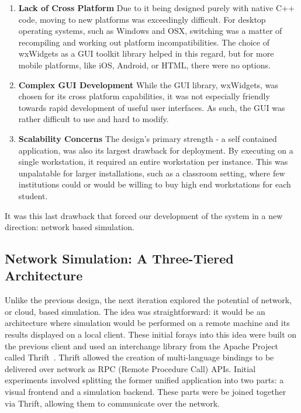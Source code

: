  \begin{enumerate}

   \item \textbf{Lack of Cross Platform} Due to it being designed
     purely with native C++ code, moving to new platforms was
     exceedingly difficult. For desktop operating systems, such as
     Windows and OSX, switching was a matter of recompiling and
     working out platform incompatibilities. The choice of wxWidgets as
     a GUI toolkit library helped in this regard, but for more mobile
     platforms, like iOS, Android, or HTML, there were no options.   
   
   \item \textbf{Complex GUI Development} While the GUI library,
     wxWidgets, was chosen for its cross platform capabilities, it was
     not especially friendly towards rapid development of useful user
     interfaces. As such, the GUI was rather difficult to use and hard
     to modify.

   \item \textbf{Scalability Concerns} The design's primary strength -
     a self contained application, was also its largest drawback for
     deployment. By executing on a single workstation, it required an
     entire workstation per instance. This was unpalatable for larger
     installations, such as a classroom setting, where few institutions
     could or would be willing to buy high end workstations for each student.
   
 \end{enumerate}

 
 It was this last drawback that forced our development of the system
 in a new direction: network based simulation.

 \subsection{Network Simulation: A Three-Tiered Architecture}
 
 Unlike the previous design, the next iteration explored the potential
 of network, or cloud, based simulation. The idea was straightforward:
 it would be an architecture where simulation would be performed on a
 remote machine and its results displayed on a local client. These
 initial forays into this idea were built on the previous client and
 used an interchange library from the Apache Project called
 Thrift~\citep{ASF:2008--2014}. Thrift allowed the creation of multi-language bindings to be
 delivered over network as RPC (Remote Procedure Call) APIs. Initial
 experiments involved splitting the former unified application into
 two parts: a visual frontend and a simulation backend. These parts
 were be joined together via Thrift, allowing them to communicate over
 the network.


